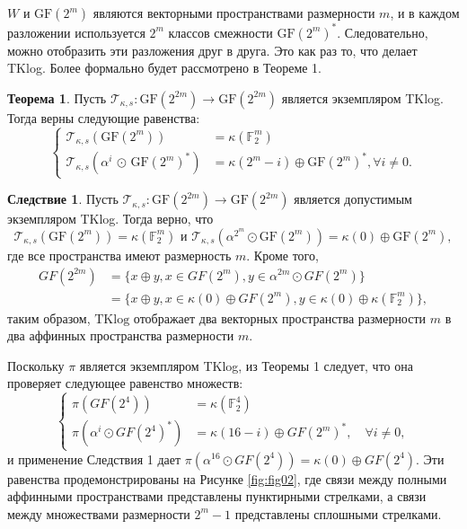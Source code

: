 \(W\) и \(\mathrm{GF}(2^m)\) являются векторными пространствами размерности \(m\), и в каждом разложении используется \(2^m\) классов смежности \(\mathrm{GF}(2^m)^*\). Следовательно, можно отобразить эти разложения друг в друга. Это как раз то, что делает TKlog. Более формально будет рассмотрено в Теореме 1.

\textbf{Теорема 1}. Пусть \(\mathscr{T}_{\kappa,s} : \mathrm{GF}(2^{2m}) \to \mathrm{GF}(2^{2m})\) является экземпляром TKlog. Тогда верны следующие равенства:
\[
\begin{cases}
  \mathscr{T}_{\kappa,s}(\mathrm{GF}(2^m)) & = \kappa(\mathbb{F}_2^m) \\
  \mathscr{T}_{\kappa,s}(\alpha^i \, \odot \, \mathrm{GF}(2^m)^*) & = \kappa(2^m - i) \oplus \mathrm{GF}(2^m)^*, \forall i \neq 0.
\end{cases}
\]

\textbf{Следствие 1}. Пусть \(\mathscr{T}_{\kappa,s} : \mathrm{GF}(2^{2m}) \to \mathrm{GF}(2^{2m})\) является допустимым экземпляром TKlog. Тогда верно, что
\[
  \mathscr{T}_{\kappa,s}(\mathrm{GF}(2^m)) = \kappa(\mathbb{F}_2^m) \text{ и } \mathscr{T}_{\kappa,s}(\alpha^{2^m} \odot \mathrm{GF}(2^m)) = \kappa(0) \oplus \mathrm{GF}(2^m),
\] где все пространства имеют размерность \( m \). Кроме того,
\begin{align*}
GF(2^{2m}) & = \{ x \oplus y, x \in GF(2^m), y \in \alpha^{2m} \odot GF(2^m) \} \\
& = \{ x \oplus y, x \in \kappa(0) \oplus GF(2^m), y \in \kappa(0) \oplus \kappa (\mathbb{F}_{2}^{m}) \},
\end{align*}
таким образом, \( \text{TKlog} \) отображает два векторных пространства размерности \( m \) в два аффинных пространства размерности \( m \).

Поскольку \( \pi \) является экземпляром TKlog, из Теоремы 1 следует, что она проверяет следующее равенство множеств:
\[
  \begin{cases}
\pi\left( GF(2^4) \right) & = \kappa(\mathbb{F}_{2}^{4}) \\
\pi\left( \alpha^i \odot GF(2^4)^{\ast} \right) & = \kappa(16 - i) \oplus GF(2^m)^{\ast}, \quad \forall i \neq 0,
  \end{cases}
\]
и применение Следствия 1 дает \(\pi(\alpha^{16} \odot GF(2^4)) = \kappa(0) \oplus GF(2^4)\). Эти равенства продемонстрированы на Рисунке \ref{fig:fig02}, где связи между полными аффинными пространствами представлены пунктирными стрелками, а связи между множествами размерности \(2^m - 1\) представлены сплошными стрелками.

